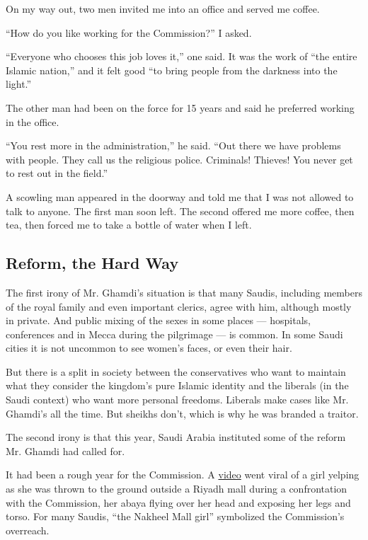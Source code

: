 On my way out, two men invited me into an office and served me coffee.

``How do you like working for the Commission?'' I asked.

``Everyone who chooses this job loves it,'' one said. It was the work of
``the entire Islamic nation,'' and it felt good ``to bring people from
the darkness into the light.''

The other man had been on the force for 15 years and said he preferred
working in the office.

``You rest more in the administration,'' he said. ``Out there we have
problems with people. They call us the religious police. Criminals!
Thieves! You never get to rest out in the field.''

A scowling man appeared in the doorway and told me that I was not
allowed to talk to anyone. The first man soon left. The second offered
me more coffee, then tea, then forced me to take a bottle of water when
I left.

\hypertarget{reform-the-hard-way}{%
\subsection{Reform, the Hard Way}\label{reform-the-hard-way}}

The first irony of Mr. Ghamdi's situation is that many Saudis, including
members of the royal family and even important clerics, agree with him,
although mostly in private. And public mixing of the sexes in some
places --- hospitals, conferences and in Mecca during the pilgrimage ---
is common. In some Saudi cities it is not uncommon to see women's faces,
or even their hair.

But there is a split in society between the conservatives who want to
maintain what they consider the kingdom's pure Islamic identity and the
liberals (in the Saudi context) who want more personal freedoms.
Liberals make cases like Mr. Ghamdi's all the time. But sheikhs don't,
which is why he was branded a traitor.

The second irony is that this year, Saudi Arabia instituted some of the
reform Mr. Ghamdi had called for.

It had been a rough year for the Commission. A
\href{https://www.youtube.com/watch?v=A6DlHxe7D-I\&oref=https\%3A\%2F\%2Fwww.youtube.com\%2Fwatch\%3Fv\%3DA6DlHxe7D-I\&has_verified=1}{video}
went viral of a girl yelping as she was thrown to the ground outside a
Riyadh mall during a confrontation with the Commission, her abaya flying
over her head and exposing her legs and torso. For many Saudis, ``the
Nakheel Mall girl'' symbolized the Commission's overreach.

